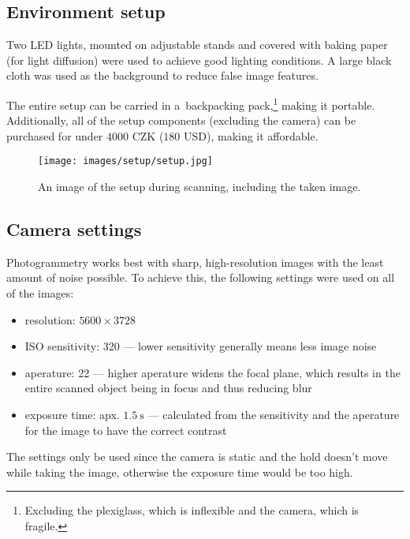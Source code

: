 \subsection{Environment setup}
Two LED lights, mounted on adjustable stands and covered with baking paper (for light diffusion) were used to achieve good lighting conditions.
A large black cloth was used as the background to reduce false image features.

The entire setup can be carried in a~backpacking pack,\footnote{Excluding the plexiglass, which is inflexible and the camera, which is fragile.} making it portable.
Additionally, all of the setup components (excluding the camera) can be purchased for under $4000$ CZK ($180$ USD), making it affordable.

\begin{figure}
	\centering
	\texttt{[image: images/setup/setup.jpg]}
	\caption{An image of the setup during scanning, including the taken image.}
	\label{fig:setup}
\end{figure}

\subsection{Camera settings}\label{sec:camsettings}
Photogrammetry works best with sharp, high-resolution images with the least amount of noise possible.
To achieve this, the following settings were used on all of the images:
\begin{itemize}
	\item resolution: $5600 \times 3728$
	\item ISO sensitivity: 320 --- lower sensitivity generally means less image noise
	\item aperature: 22 --- higher aperature widens the focal plane, which results in the entire scanned object being in focus and thus reducing blur
	\item exposure time: apx. $\SI{1.5}{\second}$ --- calculated from the sensitivity and the aperature for the image to have the correct contrast
\end{itemize}

The settings only be used since the camera is static and the hold doesn't move while taking the image, otherwise the exposure time would be too high.

